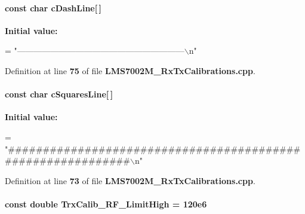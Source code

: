\paragraph[{c\+Dash\+Line}]{\setlength{\rightskip}{0pt plus 5cm}const char c\+Dash\+Line[$\,$]\hspace{0.3cm}{\ttfamily [static]}}\label{LMS7002M__RxTxCalibrations_8cpp_a48155a0581d417c7b91f248271f8d449}
{\bfseries Initial value\+:}
\begin{DoxyCode}
=
    \textcolor{stringliteral}{"------------------------------------------------------------\(\backslash\)n"}
\end{DoxyCode}


Definition at line {\bf 75} of file {\bf L\+M\+S7002\+M\+\_\+\+Rx\+Tx\+Calibrations.\+cpp}.

\paragraph[{c\+Squares\+Line}]{\setlength{\rightskip}{0pt plus 5cm}const char c\+Squares\+Line[$\,$]\hspace{0.3cm}{\ttfamily [static]}}\label{LMS7002M__RxTxCalibrations_8cpp_a33dfc3a397f4e3e95ee4a5ab8236cc2a}
{\bfseries Initial value\+:}
\begin{DoxyCode}
=
    \textcolor{stringliteral}{"############################################################\(\backslash\)n"}
\end{DoxyCode}


Definition at line {\bf 73} of file {\bf L\+M\+S7002\+M\+\_\+\+Rx\+Tx\+Calibrations.\+cpp}.

\paragraph[{Trx\+Calib\+\_\+\+R\+F\+\_\+\+Limit\+High}]{\setlength{\rightskip}{0pt plus 5cm}const double Trx\+Calib\+\_\+\+R\+F\+\_\+\+Limit\+High = 120e6}\label{LMS7002M__RxTxCalibrations_8cpp_acb17486c31c441cace9cfd73cfb0ddb0}


